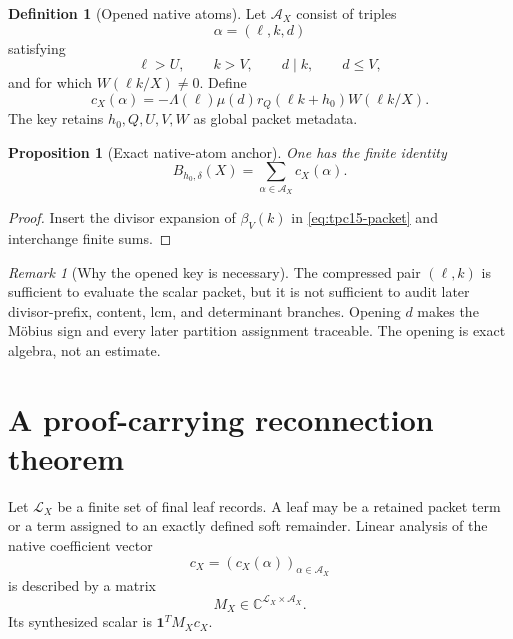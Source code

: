 \documentclass[11pt,a4paper]{article}
\newtheorem{proposition}[theorem]{Proposition}
\theoremstyle{definition}
\newtheorem{definition}[theorem]{Definition}
\theoremstyle{remark}
\newtheorem{remark}[theorem]{Remark}
\newcommand{\C}{\mathbb C}
\newcommand{\one}{\mathbf 1}
\newcommand{\cA}{\mathcal A}
\newcommand{\cL}{\mathcal L}
\begin{document}
\begin{definition}[Opened native atoms]
Let \(\cA_X\) consist of triples
\[
 \alpha=(\ell,k,d)
\]
satisfying
\[
 \ell>U,\qquad k>V,\qquad d\mid k,\qquad d\le V,
\]
and for which \(W(\ell k/X)\ne0\).  Define
\begin{equation}
 c_X(\alpha)
 =
 -\Lambda(\ell)\mu(d)r_Q(\ell k+h_0)W(\ell k/X).
 \label{eq:native-coefficient}
\end{equation}
The key retains \(h_0,Q,U,V,W\) as global packet metadata.
\end{definition}

\begin{proposition}[Exact native-atom anchor]
\label{prop:native-anchor}
One has the finite identity
\begin{equation}
 \boxed{
 B_{h_0,\delta}(X)
 =\sum_{\alpha\in\cA_X}c_X(\alpha).}
 \label{eq:opened-anchor}
\end{equation}
\end{proposition}

\begin{proof}
Insert the divisor expansion of \(\beta_V(k)\) in
\eqref{eq:tpc15-packet} and interchange finite sums.
\end{proof}

\begin{remark}[Why the opened key is necessary]
The compressed pair \((\ell,k)\) is sufficient to evaluate the scalar
packet, but it is not sufficient to audit later divisor-prefix,
content, lcm, and determinant branches.  Opening \(d\) makes the
M\"obius sign and every later partition assignment traceable.  The
opening is exact algebra, not an estimate.
\end{remark}

\section{A proof-carrying reconnection theorem}

Let \(\cL_X\) be a finite set of final leaf records.  A leaf may be a
retained packet term or a term assigned to an exactly defined soft
remainder.  Linear analysis of the native coefficient vector
\[
 c_X=(c_X(\alpha))_{\alpha\in\cA_X}
\]
is described by a matrix
\[
 M_X\in\C^{\cL_X\times\cA_X}.
\]
Its synthesized scalar is \(\one^TM_Xc_X\).
\end{document}
